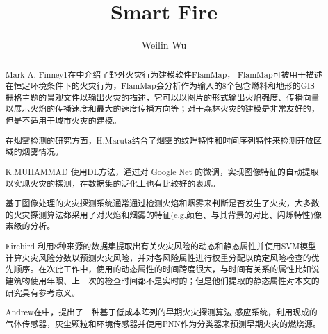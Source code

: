 \documentclass{ctexart}
\title{Smart Fire}
\author{Weilin Wu}
\begin{document}
\maketitle

\begin{abstract}
Mark A. Finney1在\cite{finney_overview_2006}中介绍了野外火灾行为建模软件FlamMap，
FlamMap可被用于描述在恒定环境条件下的火灾行为，FlamMap会分析作为输入的8个包含燃料和地形的GIS栅格主题的景观文件以输出火灾的描述，它可以以图片的形式输出火焰强度、传播向量以展示火焰的传播速度和最大的速度传播方向等；对于森林火灾的建模是非常友好的，但是不适用于城市火灾的建模。

在烟雾检测的研究方面，H.Maruta\cite{Hidenori_2009}结合了烟雾的纹理特性和时间序列特性来检测开放区域的烟雾情况。

K.MUHAMMAD \cite{K.Muhammad_2018}使用DL方法，通过对 Google Net 的微调，实现图像特征的自动提取以实现火灾的探测，在数据集的泛化上也有比较好的表现。

基于图像处理的火灾探测系统通常通过检测火焰和烟雾来判断是否发生了火灾，大多数的火灾探测算法都采用了对火焰和烟雾的特征(e.g.颜色、与其背景的对比、闪烁特性)像素级的分析\cite{MillanAn}。

Firebird \cite{madaio_firebird:_2016}利用8种来源的数据集提取出有关火灾风险的动态和静态属性并使用SVM模型计算火灾风险分数以预测火灾风险，并对各风险属性进行权重分配以确定风险检查的优先顺序。在次此工作中，使用的动态属性的时间跨度很大，与时间有关系的属性比如说建筑物使用年限、上一次的检查时间都不是实时的；但是他们提取的静态属性对本文的研究具有参考意义。

Andrew在\cite{andrew_multi-stage_2016}中，提出了一种基于低成本阵列的早期火灾探测算法
感应系统，利用现成的气体传感器，灰尘颗粒和环境传感器并使用PNN作为分类器来预测早期火灾的燃烧源。

\end{abstract}

\section{}


\end{document}
